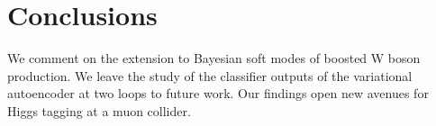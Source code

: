 \section{Conclusions}\label{sec:conclusions}

We comment on the extension to Bayesian soft modes of boosted W boson
production. We leave the study of the classifier outputs of the
variational autoencoder at two loops to future work. Our findings open
new avenues for Higgs tagging at a muon collider.

